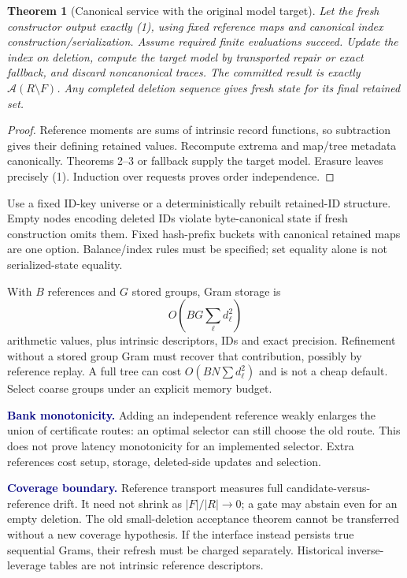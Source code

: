 \documentclass[11pt]{article}
\newtheorem{theorem}{Theorem}\newtheorem{lemma}{Lemma}\newtheorem{corollary}{Corollary}
\newcommand{\note}[1]{\textcolor{navy}{\textbf{#1}}}
\begin{document}
\begin{theorem}[Canonical service with the original model target]
Let the fresh constructor output exactly (1), using fixed reference maps and canonical index construction/serialization. Assume required finite evaluations succeed. Update the index on deletion, compute the target model by transported repair or exact fallback, and discard noncanonical traces. The committed result is exactly $\mathcal A(R\setminus F)$. Any completed deletion sequence gives fresh state for its final retained set.
\end{theorem}
\begin{proof}
Reference moments are sums of intrinsic record functions, so subtraction gives their defining retained values. Recompute extrema and map/tree metadata canonically. Theorems 2--3 or fallback supply the target model. Erasure leaves precisely (1). Induction over requests proves order independence.
\end{proof}

Use a fixed ID-key universe or a deterministically rebuilt retained-ID structure. Empty nodes encoding deleted IDs violate byte-canonical state if fresh construction omits them. Fixed hash-prefix buckets with canonical retained maps are one option. Balance/index rules must be specified; set equality alone is not serialized-state equality.

With $B$ references and $G$ stored groups, Gram storage is
\[
 O\!\left(BG\sum_\ell d_\ell^2\right)
\]
arithmetic values, plus intrinsic descriptors, IDs and exact precision. Refinement without a stored group Gram must recover that contribution, possibly by reference replay. A full tree can cost $O(BN\sum d_\ell^2)$ and is not a cheap default. Select coarse groups under an explicit memory budget.

\note{Bank monotonicity.} Adding an independent reference weakly enlarges the union of certificate routes: an optimal selector can still choose the old route. This does not prove latency monotonicity for an implemented selector. Extra references cost setup, storage, deleted-side updates and selection.

\note{Coverage boundary.} Reference transport measures full candidate-versus-reference drift. It need not shrink as $|F|/|R|\to0$; a gate may abstain even for an empty deletion. The old small-deletion acceptance theorem cannot be transferred without a new coverage hypothesis. If the interface instead persists true sequential Grams, their refresh must be charged separately. Historical inverse-leverage tables are not intrinsic reference descriptors.
\end{document}
